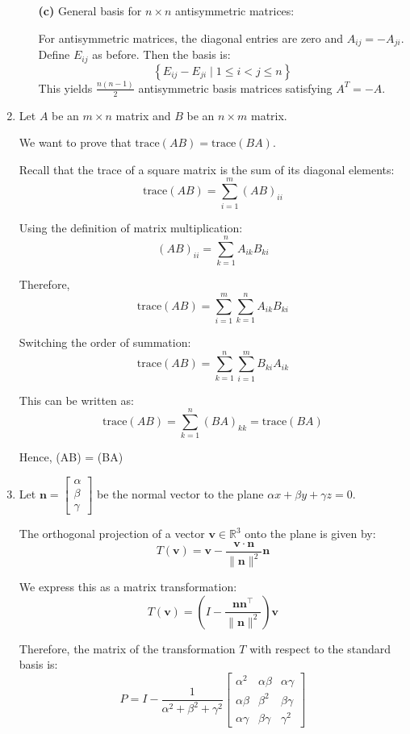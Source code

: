 \documentclass[12pt]{article}
\begin{document}
\begin{enumerate}
\begin{enumerate}
    \item[\textbf{(c)}] General basis for \( n \times n \) antisymmetric matrices:

    For antisymmetric matrices, the diagonal entries are zero and \( A_{ij} = -A_{ji} \).  
    Define \( E_{ij} \) as before. Then the basis is:
    \[
    \left\{ E_{ij} - E_{ji} \mid 1 \le i < j \le n \right\}
    \]
    This yields \( \frac{n(n-1)}{2} \) antisymmetric basis matrices satisfying \( A^T = -A \).
\end{enumerate}

\item Let \( A \) be an \( m \times n \) matrix and \( B \) be an \( n \times m \) matrix.

We want to prove that \( \text{trace}(AB) = \text{trace}(BA) \).

Recall that the trace of a square matrix is the sum of its diagonal elements:
\[
\text{trace}(AB) = \sum_{i=1}^{m} (AB)_{ii}
\]

Using the definition of matrix multiplication:
\[
(AB)_{ii} = \sum_{k=1}^{n} A_{ik} B_{ki}
\]

Therefore,
\[
\text{trace}(AB) = \sum_{i=1}^{m} \sum_{k=1}^{n} A_{ik} B_{ki}
\]

Switching the order of summation:
\[
\text{trace}(AB) = \sum_{k=1}^{n} \sum_{i=1}^{m} B_{ki} A_{ik}
\]

This can be written as:
\[
\text{trace}(AB) = \sum_{k=1}^{n} (BA)_{kk} = \text{trace}(BA)
\]

Hence,
(AB) = (BA)

\item 
Let \( \mathbf{n} = \begin{bmatrix} \alpha \\ \beta \\ \gamma \end{bmatrix} \) be the normal vector to the plane \( \alpha x + \beta y + \gamma z = 0 \).

The orthogonal projection of a vector \( \mathbf{v} \in \mathbb{R}^3 \) onto the plane is given by:
\[
T(\mathbf{v}) = \mathbf{v} - \frac{\mathbf{v} \cdot \mathbf{n}}{\|\mathbf{n}\|^2} \mathbf{n}
\]

We express this as a matrix transformation:
\[
T(\mathbf{v}) = \left( I - \frac{\mathbf{n} \mathbf{n}^\top}{\|\mathbf{n}\|^2} \right) \mathbf{v}
\]

Therefore, the matrix of the transformation \( T \) with respect to the standard basis is:
\[
P = I - \frac{1}{\alpha^2 + \beta^2 + \gamma^2}
\begin{bmatrix}
\alpha^2 & \alpha \beta & \alpha \gamma \\
\alpha \beta & \beta^2 & \beta \gamma \\
\alpha \gamma & \beta \gamma & \gamma^2
\end{bmatrix}
\]



\end{enumerate}
\end{document}
